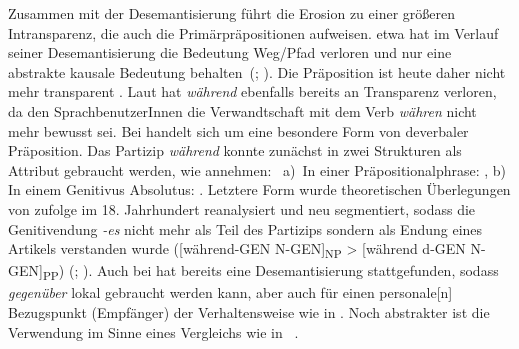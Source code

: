 Zusammen mit der Desemantisierung führt die Erosion zu einer größeren Intransparenz, die auch die Primärpräpositionen aufweisen. 
etwa hat im Verlauf seiner Desemantisierung die Bedeutung \glq Weg/Pfad\grq{} verloren und nur eine abstrakte kausale Bedeutung behalten~(\citealp[s.][219]{Schroder1986}; \citealp[215]{DiMeola2003}). 
Die Präposition ist heute daher nicht mehr transparent \citep[s.][147]{DiMeola2000}.
Laut \citet[147]{DiMeola2000} hat \textit{w{\"a}hrend }ebenfalls bereits an Transparenz verloren, da den SprachbenutzerInnen die Verwandtschaft mit dem Verb \textit{w{\"a}hren }nicht mehr bewusst sei.
Bei  handelt sich um eine besondere Form von deverbaler Präposition. 
Das Partizip \textit{w{\"a}hrend }konnte zun{\"a}chst in zwei Strukturen als Attribut gebraucht werden, wie \citet[26]{Lehmann1992} annehmen:~
a)~In einer Pr{\"a}positionalphrase: ,
b) In einem Genitivus Absolutus: .
Letztere Form wurde theoretischen Überlegungen von \citet[26]{Lehmann1992} zufolge im 18. Jahrhundert reanalysiert und neu segmentiert, sodass die Genitivendung \textit{-es }nicht mehr als Teil des Partizips sondern als Endung eines Artikels verstanden wurde ([w{\"a}hrend-GEN N-GEN]\textsubscript{NP} {\textgreater} [w{\"a}hrend d-GEN N-GEN]\textsubscript{PP}) (\citealp[s.][26]{Lehmann1992}; \citealp[vgl. auch][218--219]{Lindqvist1994}). 
Auch bei hat bereits eine Desemantisierung stattgefunden, sodass \textit{gegen{\"u}ber }lokal gebraucht werden kann, aber auch für einen \glqq personale[n] Bezugspunkt (Empfänger) der Verhaltensweise\grqq{} \citep[374]{Helbig.2017} wie in .
Noch abstrakter ist die Verwendung im Sinne eines Vergleichs wie in ~\citep[s.][167]{Eroms1981}. 


